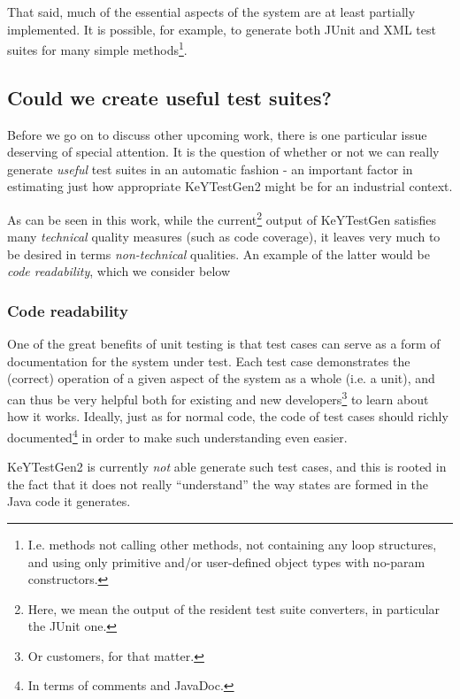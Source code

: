 \documentclass{article}
\newcommand{\tmem}[1]{{\em #1\/}}
\begin{document}
That said, much of the essential aspects of the system are at least partially
implemented. It is possible, for example, to generate both JUnit and XML test
suites for many simple methods{\hspace{0.0em}}{\footnote{I.e. methods not
calling other methods, not containing any loop structures, and using only
primitive and/or user-defined object types with no-param constructors.}}.



\subsection{Could we create useful test suites?}

Before we go on to discuss other upcoming work, there is one particular issue
deserving of special attention. It is the question of whether or not we can
really generate {\tmem{useful}} test suites in an automatic fashion - an
important factor in estimating just how appropriate KeYTestGen2 might be for
an industrial context.



As can be seen in this work, while the current{\footnote{Here, we mean the
output of the resident test suite converters, in particular the JUnit one.}}
output of KeYTestGen satisfies many {\tmem{technical}} quality measures (such
as code coverage), it leaves very much to be desired in terms
{\tmem{non-technical}} qualities. An example of the latter would be
{\tmem{code readability}}, which we consider below



\subsubsection{Code readability}

One of the great benefits of unit testing is that test cases can serve as a
form of documentation for the system under test. Each test case demonstrates
the (correct) operation of a given aspect of the system as a whole (i.e. a
unit), and can thus be very helpful both for existing and new
developers{\footnote{Or customers, for that matter.}} to learn about how it
works. Ideally, just as for normal code, the code of test cases should richly
documented{\footnote{In terms of comments and JavaDoc.}} in order to make such
understanding even easier.



KeYTestGen2 is currently {\tmem{not}} able generate such test cases, and this
is rooted in the fact that it does not really ``understand'' the way states
are formed in the Java code it generates.
\end{document}
